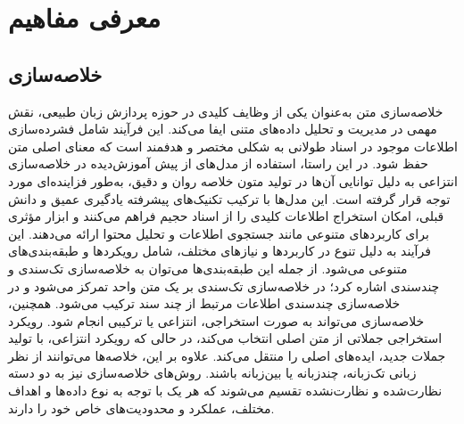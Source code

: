 \chapter{معرفی مفاهیم}


\section{خلاصه‌سازی}
خلاصه‌سازی متن به‌عنوان یکی از وظایف کلیدی در حوزه پردازش زبان طبیعی، نقش مهمی در مدیریت و تحلیل داده‌های متنی ایفا می‌کند. این فرآیند شامل فشرده‌سازی اطلاعات موجود در اسناد طولانی به شکلی مختصر و هدفمند است که معنای اصلی متن حفظ شود. در این راستا، استفاده از مدل‌های از پیش آموزش‌دیده در خلاصه‌سازی انتزاعی به دلیل توانایی آن‌ها در تولید متون خلاصه روان و دقیق، به‌طور فزاینده‌ای مورد توجه قرار گرفته است. این مدل‌ها با ترکیب تکنیک‌های پیشرفته یادگیری عمیق و دانش قبلی، امکان استخراج اطلاعات کلیدی را از اسناد حجیم فراهم می‌کنند و ابزار مؤثری برای کاربردهای متنوعی مانند جستجوی اطلاعات و تحلیل محتوا ارائه می‌دهند.
این فرآیند به دلیل تنوع در کاربردها و نیازهای مختلف، شامل رویکردها و طبقه‌بندی‌های متنوعی می‌شود. از جمله این طبقه‌بندی‌ها می‌توان به خلاصه‌سازی تک‌سندی و چندسندی اشاره کرد؛ در خلاصه‌سازی تک‌سندی بر یک متن واحد تمرکز می‌شود و در خلاصه‌سازی چندسندی اطلاعات مرتبط از چند سند ترکیب می‌شود. همچنین، خلاصه‌سازی می‌تواند به صورت استخراجی، انتزاعی یا ترکیبی انجام شود. رویکرد استخراجی جملاتی از متن اصلی انتخاب می‌کند، در حالی که رویکرد انتزاعی، با تولید جملات جدید، ایده‌های اصلی را منتقل می‌کند. علاوه بر این، خلاصه‌ها می‌توانند از نظر زبانی تک‌زبانه، چندزبانه یا بین‌زبانه باشند. روش‌های خلاصه‌سازی نیز به دو دسته نظارت‌شده و نظارت‌نشده تقسیم می‌شوند که هر یک با توجه به نوع داده‌ها و اهداف مختلف، عملکرد و محدودیت‌های خاص خود را دارند.


